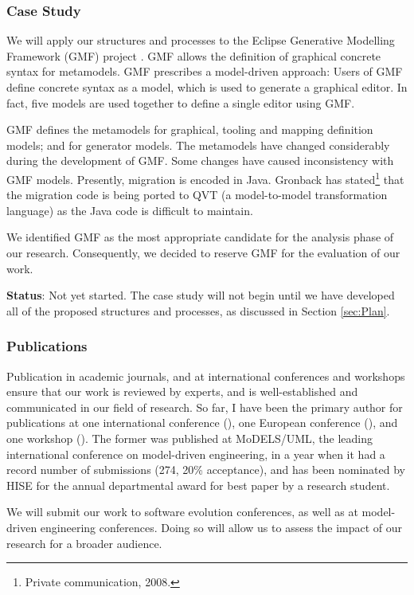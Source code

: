 \subsubsection{Case Study}
\label{subsubsec:case_study}
We will apply our structures and processes to the Eclipse Generative Modelling Framework (GMF) project \cite{gronback06gmf}. GMF allows the definition of graphical concrete syntax for metamodels. GMF prescribes a model-driven approach: Users of GMF define concrete syntax as a model, which is used to generate a graphical editor. In fact, five models are used together to define a single editor using GMF.

GMF defines the metamodels for graphical, tooling and mapping definition models; and for generator models. The metamodels have changed considerably during the development of GMF. Some changes have caused inconsistency with GMF models. Presently, migration is encoded in Java. Gronback has stated\footnote{Private communication, 2008.} that the migration code is being ported to QVT (a model-to-model transformation language) as the Java code is difficult to maintain.

We identified GMF as the most appropriate candidate for the analysis phase of our research. Consequently, we decided to reserve GMF for the evaluation of our work.

\textbf{Status}: Not yet started. The case study will not begin until we have developed all of the proposed structures and processes, as discussed in Section \ref{sec:Plan}.


\subsubsection{Publications}
Publication in academic journals, and at international conferences and workshops ensure that our work is reviewed by experts, and is well-established and communicated in our field of research. So far, I have been the primary author for publications at one international conference (\cite{rose08hutn}), one European conference (\cite{rose08egl}), and one workshop (\cite{rose09patterns}). The former was published at MoDELS/UML, the leading international conference on model-driven engineering, in a year when it had a record number of submissions (274, 20\% acceptance), and has been nominated by HISE for the annual departmental award for best paper by a research student.

We will submit our work to software evolution conferences, as well as at model-driven engineering conferences. Doing so will allow us to assess the impact of our research for a broader audience.

